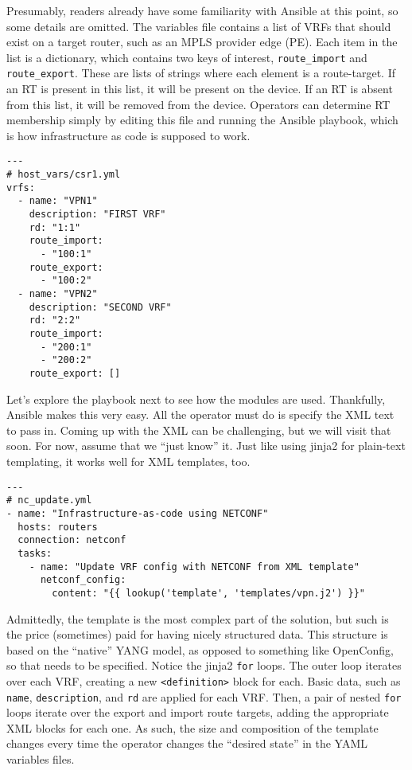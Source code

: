 Presumably, readers already have some familiarity with Ansible at this point, so
some details are omitted. The variables file contains a list of VRFs that
should exist on a target router, such as an MPLS provider edge (PE). Each item
in the list is a dictionary, which contains two keys of interest,
\verb|route_import| and \verb|route_export|. These are lists of strings where
each element is a route-target. If an RT is present in this list, it will be
present on the device. If an RT is absent from this list, it will be removed
from the device. Operators can determine RT membership simply by editing this
file and running the Ansible playbook, which is how infrastructure as code
is supposed to work.

\begin{verbatim}
---
# host_vars/csr1.yml
vrfs:
  - name: "VPN1"
    description: "FIRST VRF"
    rd: "1:1"
    route_import:
      - "100:1"
    route_export:
      - "100:2"
  - name: "VPN2"
    description: "SECOND VRF"
    rd: "2:2"
    route_import:
      - "200:1"
      - "200:2"
    route_export: []
\end{verbatim}

Let's explore the playbook next to see how the modules are used. Thankfully,
Ansible makes this very easy. All the operator must do is specify the XML
text to pass in. Coming up with the XML can be challenging, but we will visit
that soon. For now, assume that we ``just know'' it. Just like using jinja2 for
plain-text templating, it works well for XML templates, too.

\begin{verbatim}
---
# nc_update.yml
- name: "Infrastructure-as-code using NETCONF"
  hosts: routers
  connection: netconf
  tasks:
    - name: "Update VRF config with NETCONF from XML template"
      netconf_config:
        content: "{{ lookup('template', 'templates/vpn.j2') }}"
\end{verbatim}

Admittedly, the template is the most complex part of the solution, but such is
the price (sometimes) paid for having nicely structured data. This structure
is based on the ``native'' YANG model, as opposed to something like OpenConfig,
so that needs to be specified. Notice the jinja2 \verb|for| loops. The outer
loop iterates over each VRF, creating a new \verb|<definition>| block for each.
Basic data, such as \verb|name|, \verb|description|, and \verb|rd| are applied
for each VRF\@. Then, a pair of nested \verb|for| loops iterate over the export
and import route targets, adding the appropriate XML blocks for each one. As
such, the size and composition of the template changes every time the operator
changes the ``desired state'' in the YAML variables files.


